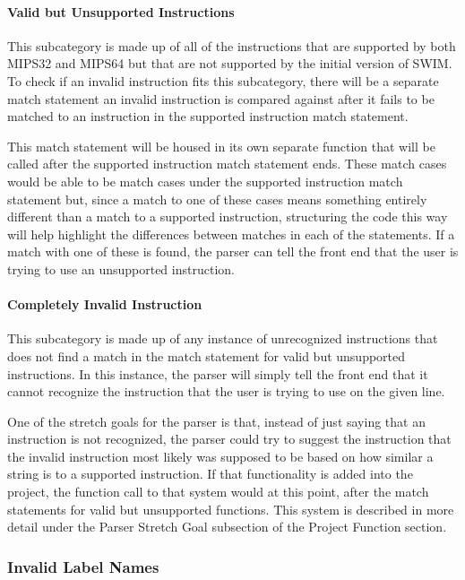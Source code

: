 \documentclass[parskip=half, fontsize=12pt]{scrartcl}
\begin{document}
\paragraph{Valid but Unsupported Instructions}

This subcategory is made up of all of the instructions that are
supported by both MIPS32 and MIPS64 but that are not supported by the
initial version of SWIM. To check if an invalid instruction fits this
subcategory, there will be a separate match statement an invalid
instruction is compared against after it fails to be matched to an
instruction in the supported instruction match statement.

This match statement will be housed in its own separate function that
will be called after the supported instruction match statement ends.
These match cases would be able to be match cases under the supported
instruction match statement but, since a match to one of these cases
means something entirely different than a match to a supported
instruction, structuring the code this way will help highlight the
differences between matches in each of the statements. If a match with
one of these is found, the parser can tell the front end that the user
is trying to use an unsupported instruction.

\paragraph{Completely Invalid Instruction}

This subcategory is made up of any instance of unrecognized instructions
that does not find a match in the match statement for valid but
unsupported instructions. In this instance, the parser will simply tell
the front end that it cannot recognize the instruction that the user is
trying to use on the given line.

One of the stretch goals for the parser is that, instead of just saying
that an instruction is not recognized, the parser could try to suggest
the instruction that the invalid instruction most likely was supposed to
be based on how similar a string is to a supported instruction. If that
functionality is added into the project, the function call to that
system would at this point, after the match statements for valid but
unsupported functions. This system is described in more detail under the
Parser Stretch Goal subsection of the Project Function section.

\subsubsection{Invalid Label Names}
\end{document}

